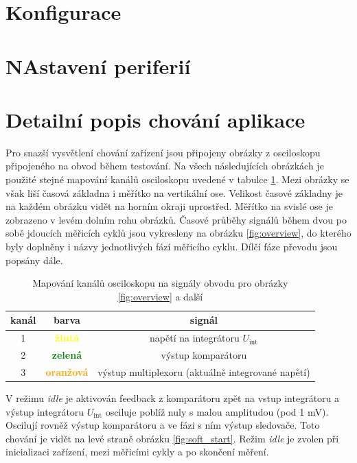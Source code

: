 \documentclass[twoside]{article}
\begin{document}
\section{Konfigurace}
\label{sec:config}

\section{NAstavení periferií}


\section{Detailní popis chování aplikace}
\label{sec:detail}
Pro snazší vysvětlení chování zařízení jsou připojeny obrázky z osciloskopu připojeného na obvod během testování.
Na všech následujících obrázkách je použité stejné mapování kanálů osciloskopu uvedené v tabulce \ref{table:oscilloscope}.
Mezi obrázky se však liší časová základna i měřítko na vertikální ose. Velikost časové základny je na každém obrázku vidět
na horním okraji uprostřed. Měřítko na svislé ose je zobrazeno v levém dolním rohu obrázků.
Časové průběhy signálů během dvou po sobě jdoucích měřicích cyklů jsou vykresleny na obrázku \ref{fig:overview},
do kterého byly doplněny i názvy jednotlivých fází měřicího cyklu. Dílčí fáze převodu jsou popsány dále.

\begin{table}
    \centering
    \begin{tabular}{c|c|c}
        kanál & barva & signál \\ \hline
        1 & \textcolor{yellow}{\textbf{žlutá}} & napětí na integrátoru $U_{\text{int}}$ \\
        2 & \textcolor{green}{\textbf{zelená}} & výstup komparátoru \\
        3 & \textcolor{orange}{\textbf{oranžová}} & výstup multiplexoru (aktuálně integrované napětí)
    \end{tabular}
    \caption{Mapování kanálů osciloskopu na signály obvodu pro obrázky \ref{fig:overview} a další}
    \label{table:oscilloscope}
\end{table}

V režimu \textit{idle} je aktivován feedback z komparátoru zpět na vstup integrátoru a výstup integrátoru $U_{\text{int}}$ osciluje poblíž nuly s malou amplitudou (pod 1 mV).
Oscilují rovněž výstup komparátoru a ve fázi s ním výstup sledovače. Toto chování je vidět na levé straně obrázku \ref{fig:soft_start}.
Režim \textit{idle} je zvolen při inicializaci zařízení, mezi měřicími cykly a po skončení měření.
\end{document}
